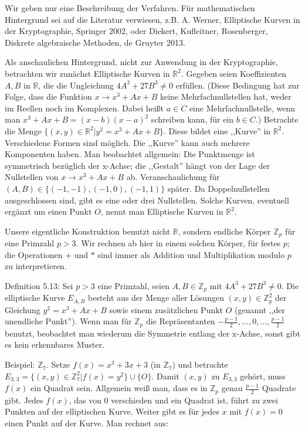 \documentclass[a4paper]{article}
\begin{document}
\begin{multicols}{3}
{{{{Wir geben nur eine Beschreibung der Verfahren. Für mathematischen Hintergrund sei auf die Literatur verwiesen, z.B. A. Werner, Elliptische Kurven in der Kryptographie, Springer 2002, oder Diekert, Kufleitner, Rosenberger, Diskrete algebraische Methoden, de Gruyter 2013.

Als anschaulichen Hintergrund, nicht zur Anwendung in der Kryptographie, betrachten wir zunächst Elliptische Kurven in $\mathbb{R}^2$. Gegeben seien Koeffizienten $A, B$ in $\mathbb{R}$, die die Ungleichung $4A^3+ 27B^3 \not= 0$ erfüllen. (Diese Bedingung hat zur Folge, dass die Funktion $x\rightarrow x^3+Ax+B$ keine Mehrfachnullstellen hat, weder im Reellen noch im Komplexen. Dabei heißt $a\in C$ eine Mehrfachnullstelle, wenn man $x^3+Ax+B= (x-b)(x-a)^2$ schreiben kann, für ein $b\in C$.) Betrachte die Menge $\{(x,y)\in\mathbb{R}^2| y^2=x^3+Ax+B\}$.
Diese bildet eine ,,Kurve'' in $\mathbb{R}^2$. Verschiedene Formen sind möglich. Die ,,Kurve'' kann auch mehrere Komponenten haben. Man beobachtet allgemein: Die Punktmenge ist symmetrisch bezüglich der x-Achse; die ,,Gestalt'' hängt von der Lage der Nullstellen von $x\rightarrow x^3+Ax+B$ ab. Veranschaulichung für $(A,B)\in\{(- 1 ,-1),(- 1 ,0),(- 1 ,1)\}$ später. Da Doppelnullstellen ausgeschlossen sind, gibt es eine oder drei Nullstellen.
Solche Kurven, eventuell ergänzt um einen Punkt $O$, nennt man Elliptische Kurven in $\mathbb{R}^2$.

Unsere eigentliche Konstruktion benutzt nicht $\mathbb{R}$, sondern endliche Körper $\mathbb{Z}_p$ für eine Primzahl $p>3$. Wir rechnen ab hier in einem solchen Körper, für festes $p$; die Operationen $+$ und $*$ sind immer als Addition und Multiplikation modulo $p$ zu interpretieren.

Definition 5.13: Sei $p >3$ eine Primzahl, seien $A,B\in\mathbb{Z}_p$ mit $4A^3+ 27B^3 \not= 0$. Die elliptische Kurve $E_{A,B}$ besteht aus der Menge aller Lösungen $(x,y)\in\mathbb{Z}^2_p$ der Gleichung $y^2=x^3+Ax+B$ sowie einem zusätzlichen Punkt $O$ (genannt ,,der unendliche Punkt'').
Wenn man für $\mathbb{Z}_p$ die Repräsentanten $-\frac{p-1}{2},..., 0 , ...,\frac{p-1}{2}$ benutzt, beobachtet man wiederum die Symmetrie entlang der x-Achse, sonst gibt es kein erkennbares Muster.

Beispiel: $\mathbb{Z}_7$. Setze $f(x)=x^3+ 3x+ 3$ (in $\mathbb{Z}_7$) und betrachte $E_{3,3}=\{(x,y)\in\mathbb{Z}^2_7 | f(x)=y^2\}\cup \{O\}$. Damit $(x,y)$ zu $E_{3,3}$ gehört, muss $f(x)$ ein Quadrat sein. Allgemein weiß man, dass es in $\mathbb{Z}_p$ genau $\frac{p-1}{2}$ Quadrate gibt. Jedes $f(x)$, das von $0$ verschieden und ein Quadrat ist, führt zu zwei Punkten auf der elliptischen Kurve. Weiter gibt es für jedes $x$ mit $f(x) = 0$ einen Punkt auf der Kurve. Man rechnet aus:

}}}}
\end{multicols}
\end{document}
